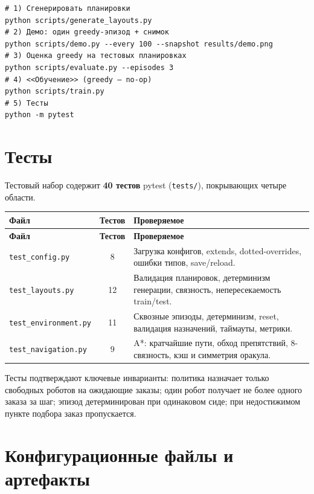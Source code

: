 \documentclass[11pt,a4paper]{article}
\newcommand{\code}[1]{\texttt{#1}}
\begin{document}
\begin{lstlisting}[style=plain]
# 1) Сгенерировать планировки
python scripts/generate_layouts.py
# 2) Демо: один greedy-эпизод + снимок
python scripts/demo.py --every 100 --snapshot results/demo.png
# 3) Оценка greedy на тестовых планировках
python scripts/evaluate.py --episodes 3
# 4) <<Обучение>> (greedy — no-op)
python scripts/train.py
# 5) Тесты
python -m pytest
\end{lstlisting}

\section{Тесты}
Тестовый набор содержит \textbf{40 тестов} pytest
(\code{tests/}), покрывающих четыре области.

\begin{longtable}{@{}p{}cp{}@{}}
\toprule
\textbf{Файл} & \textbf{Тестов} & \textbf{Проверяемое} \\
\midrule
\endfirsthead
\toprule
\textbf{Файл} & \textbf{Тестов} & \textbf{Проверяемое} \\
\midrule
\endhead
\code{test\_config.py} & 8 & Загрузка конфигов, extends, dotted-overrides,
ошибки типов, save/reload. \\
\code{test\_layouts.py} & 12 & Валидация планировок, детерминизм генерации,
связность, непересекаемость train/test. \\
\code{test\_environment.py} & 11 & Сквозные эпизоды, детерминизм, reset,
валидация назначений, таймауты, метрики. \\
\code{test\_navigation.py} & 9 & A*: кратчайшие пути, обход препятствий,
8-связность, кэш и симметрия оракула. \\
\bottomrule
\end{longtable}

Тесты подтверждают ключевые инварианты: политика назначает только свободных
роботов на ожидающие заказы; один робот получает не более одного заказа за шаг;
эпизод детерминирован при одинаковом сиде; при недостижимом пункте подбора
заказ пропускается.

\section{Конфигурационные файлы и артефакты}
\end{document}
